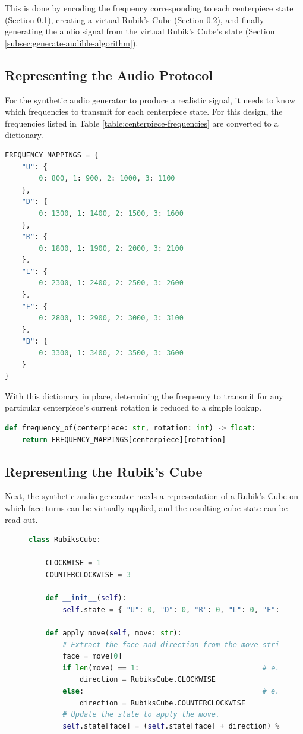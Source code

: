 This is done by encoding the frequency corresponding to each centerpiece state (Section \ref{subsec:represent-audio-protocol}), creating a virtual Rubik's Cube (Section \ref{subsec:represent-rubiks-cube}), and finally generating the audio signal from the virtual Rubik's Cube's state (Section \ref{subsec:generate-audible-algorithm}).
\newpage
\subsection{Representing the Audio Protocol}
\label{subsec:represent-audio-protocol}
For the synthetic audio generator to produce a realistic signal, it needs to know which frequencies to transmit for each centerpiece state. 
For this design, the frequencies listed in Table \ref{table:centerpiece-frequencies} are converted to a dictionary.

\begin{lstlisting}[language=Python]
FREQUENCY_MAPPINGS = {
    "U": {
        0: 800, 1: 900, 2: 1000, 3: 1100
    },
    "D": {
        0: 1300, 1: 1400, 2: 1500, 3: 1600
    },
    "R": {
        0: 1800, 1: 1900, 2: 2000, 3: 2100
    },
    "L": {
        0: 2300, 1: 2400, 2: 2500, 3: 2600
    },
    "F": {
        0: 2800, 1: 2900, 2: 3000, 3: 3100
    },
    "B": {
        0: 3300, 1: 3400, 2: 3500, 3: 3600
    }
}
\end{lstlisting}

With this dictionary in place, determining the frequency to transmit for any particular centerpiece's current rotation is reduced to a simple lookup.
\begin{lstlisting}[language=Python]
def frequency_of(centerpiece: str, rotation: int) -> float:
    return FREQUENCY_MAPPINGS[centerpiece][rotation]
\end{lstlisting}

\subsection{Representing the Rubik's Cube}
\label{subsec:represent-rubiks-cube}
Next, the synthetic audio generator needs a representation of a Rubik's Cube on which face turns can be virtually applied, and the resulting cube state can be read out.
\begin{figure}[h]
\begin{lstlisting}[language=Python]
class RubiksCube:
    
    CLOCKWISE = 1
    COUNTERCLOCKWISE = 3

    def __init__(self):
        self.state = { "U": 0, "D": 0, "R": 0, "L": 0, "F": 0, "B": 0 }
    
    def apply_move(self, move: str):
        # Extract the face and direction from the move string.
        face = move[0]
        if len(move) == 1:                             # e.g. U
            direction = RubiksCube.CLOCKWISE
        else:                                          # e.g. U'
            direction = RubiksCube.COUNTERCLOCKWISE
        # Update the state to apply the move.
        self.state[face] = (self.state[face] + direction) % 4
\end{lstlisting}
\label{fig:rubiks-cube-code}
\end{figure}

